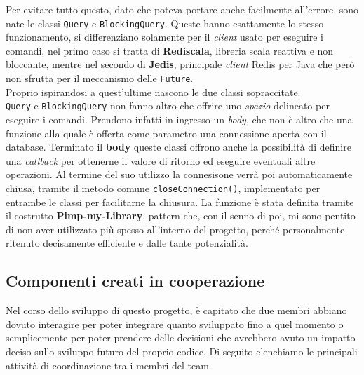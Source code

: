           Per evitare tutto questo, dato che poteva portare anche facilmente all'errore, sono nate le classi \texttt{Query} e \texttt{BlockingQuery}. Queste hanno esattamente lo stesso funzionamento, si differenziano solamente per il \textit{client} usato per eseguire i comandi, nel primo caso si tratta di \textbf{Rediscala}, libreria scala reattiva e non bloccante, mentre nel secondo di \textbf{Jedis}, principale \textit{client} Redis per Java che però non sfrutta per il meccanismo delle \texttt{Future}. 
          \\
          Proprio ispirandosi a quest'ultime nascono le due classi sopraccitate. \\
          \texttt{Query} e \texttt{BlockingQuery} non fanno altro che offrire uno \textit{spazio} delineato per eseguire i comandi. Prendono infatti in ingresso un \textit{body}, che non è altro che una funzione alla quale è offerta come parametro una connessione aperta con il database. Terminato il \textbf{body} queste classi offrono anche la possibilità di definire una \textit{callback} per ottenerne il valore di ritorno ed eseguire eventuali altre operazioni.
          Al termine del suo utilizzo la connesisone verrà poi automaticamente chiusa, tramite il metodo comune \texttt{closeConnection()}, implementato per entrambe le classi per facilitarne la chiusura.
          La funzione è stata definita tramite il costrutto \textbf{Pimp-my-Library}, pattern che, con il senno di poi, mi sono pentito di non aver utilizzato più spesso all'interno del progetto, perché personalmente ritenuto decisamente efficiente e dalle tante potenzialità.
          
          
          

          
          
          
      
      \clearpage
      
        
        \subsection{Componenti creati in cooperazione}\label{subsec:cooperation}
        Nel corso dello sviluppo di questo progetto, è capitato che due membri abbiano dovuto interagire per poter integrare quanto sviluppato fino a quel momento o semplicemente per poter prendere delle decisioni che avrebbero avuto un impatto deciso sullo sviluppo futuro del proprio codice. Di seguito elenchiamo le principali attività di coordinazione tra i membri del team.
        
